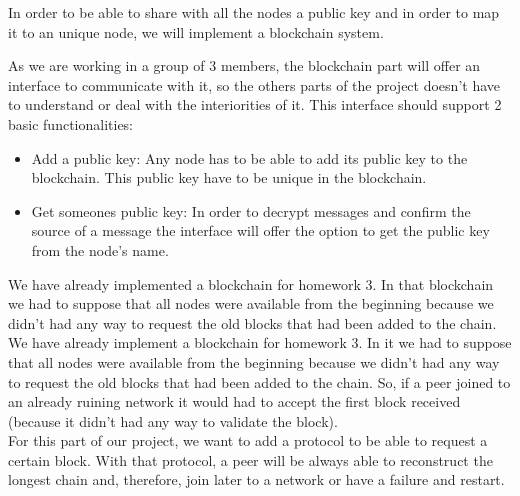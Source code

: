 \documentclass[12pt,a4paper,draft]{article}
\begin{document}
In order to be able to share with all the nodes a public key and in order to map it to an unique node, we will implement a blockchain system. 

As we are working in a group of 3 members, the blockchain part will offer an interface to communicate with it, so the others parts of the project doesn't have to understand or deal with the interiorities of it. This interface should support 2 basic functionalities:

\begin{itemize}
 \item Add a public key: Any node has to be able to add its public key to the blockchain. This public key have to be unique in the blockchain.
 \item Get someones public key: In order to decrypt messages and confirm the source of a message the interface will offer the option to get the public key from the node's name.
\end{itemize}

We have already implemented a blockchain for homework 3. In that blockchain we had to suppose that all nodes were available from the beginning because we didn't had any way to request the old blocks that had been added to the chain.
We have already implement a blockchain for homework 3. 
In it we had to suppose that all nodes were available from the beginning because we didn't had any way to request the old blocks that had been added to the chain. 
So, if a peer joined to an already ruining network it would had to accept the first block received (because it didn't had any way to validate the block). \\

For this part of our project, we want to add a protocol to be able to request a certain block. With that protocol, a peer will be always able to reconstruct the longest chain and, therefore, join later to a network or have a failure and restart.
\end{document}
